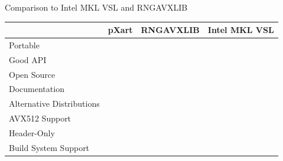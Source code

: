 \documentclass[aspectratio=169]{beamer}
\begin{document}
    \begin{frame}{Comparison to Intel MKL VSL and RNGAVXLIB}
      \renewcommand{\checkmark}{\textcolor{cgreen}{\ding{52}}}
      \newcommand{\crossmark}{\textcolor{cred}{\ding{56}}}
      \begin{table}
        \begin{tabular}{lccc}
          \hline
          & pXart & RNGAVXLIB & Intel MKL VSL \\
          \hline
          \hline
          \rowcolor{bgc}
          Portable & \checkmark & \crossmark & \crossmark \\
          Good API & \checkmark & \crossmark & \crossmark \\
          \rowcolor{bgc}
          Open Source & \checkmark & \checkmark & \crossmark \\
          Documentation & \checkmark & \crossmark & \checkmark \\
          \rowcolor{bgc}
          Alternative Distributions & \crossmark & \checkmark & \checkmark \\
          AVX512 Support & \crossmark & \crossmark & \checkmark \\
          \hline
          \hline
          \rowcolor{bgc}
          Header-Only & \checkmark & \crossmark & \crossmark \\
          Build System Support & \checkmark & \crossmark & \crossmark \\
          \hline
        \end{tabular}
      \end{table}
    \end{frame}
\end{document}
